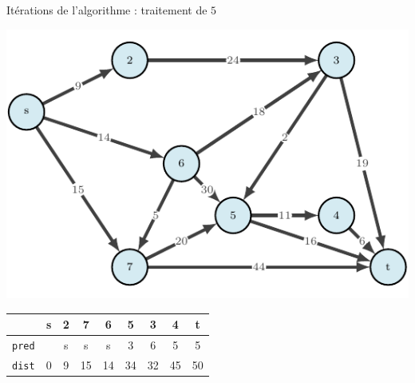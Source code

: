 \begin{frame}{Itérations de l'algorithme : traitement de $5$}
    \begin{center}
        \includegraphics[height=.6\textheight]{fig/dijkstra-0.pdf}      
    \begin{tabular}{c|cccccccc}
      
        & \textbf{s}   &\textbf{2}     &\textbf{7}     &\textbf{6}     &\textbf{5}     &\textbf{3}     &4      &t      \\
        \hline
        \texttt{pred} & &s      &s      &s      &3      &6      &5      &5      \\
        \texttt{dist} & 0       &9      &15     &14     &34     &32     &45     &50     \\
            \end{tabular}
\end{center}
\end{frame}


